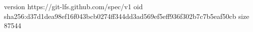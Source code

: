 version https://git-lfs.github.com/spec/v1
oid sha256:d37d1dea98ef16f043bcb0274ff344dd3ad569ef5eff936f302b7c7b5eaf50cb
size 87544
